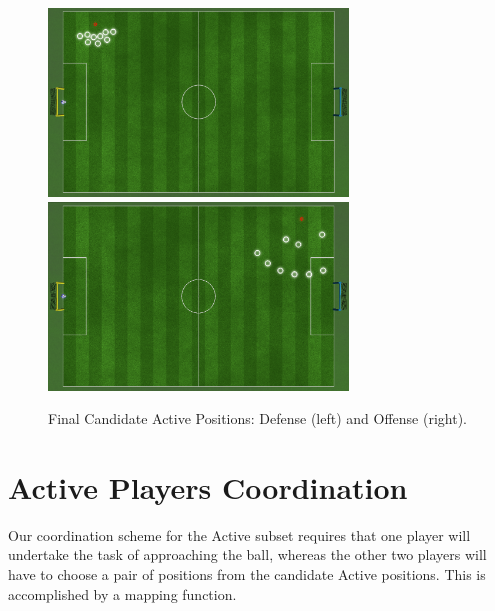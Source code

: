 \begin{figure}[t!]
\centering
  \includegraphics[height=5cm, clip, trim=0cm 10cm 20cm 0cm]{Chapter4/figures/ActiveAfter(-8,6).png} \	
  \includegraphics[height=5cm, clip, trim=20cm 10cm 0cm 0cm]{Chapter4/figures/ActiveAfter(8,6).png}
  \caption{Final Candidate Active Positions: Defense (left) and Offense (right).} 
  \label{fig:ActivePositions3}
\end{figure}


\section{Active Players Coordination}
\label{sec:ActiveCoordination}
Our coordination scheme for the Active subset requires that one player will undertake the task of approaching the ball, whereas the other two players will have to choose a pair of positions from the candidate Active positions.  This is accomplished by a mapping function.  

